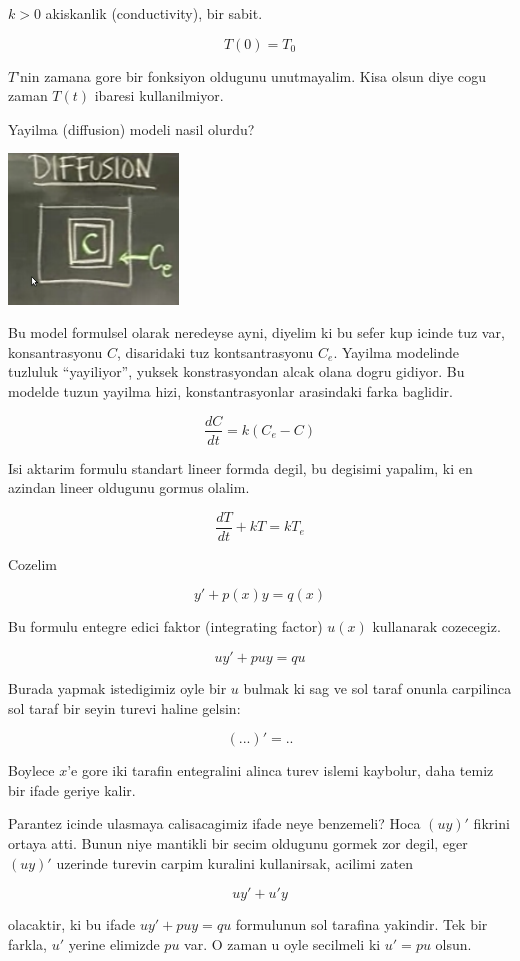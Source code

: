 \documentclass[12pt,fleqn]{article}
\begin{document}
$k > 0$ akiskanlik (conductivity), bir sabit.

\[ T(0) = T_0 \]

$T$'nin zamana gore bir fonksiyon oldugunu unutmayalim. Kisa olsun diye
cogu zaman $T(t)$ ibaresi kullanilmiyor. 

Yayilma (diffusion) modeli nasil olurdu? 

\includegraphics[height=4cm]{3_2.png}

Bu model formulsel olarak neredeyse ayni, diyelim ki bu sefer kup
icinde tuz var, konsantrasyonu $C$, disaridaki tuz kontsantrasyonu
$C_e$. Yayilma modelinde tuzluluk ``yayiliyor'', yuksek konstrasyondan
alcak olana dogru gidiyor. Bu modelde tuzun yayilma hizi,
konstantrasyonlar arasindaki farka baglidir. 

\[ \frac{dC}{dt} = k(C_e - C) \]

Isi aktarim formulu standart lineer formda degil, bu degisimi
yapalim, ki en azindan lineer oldugunu gormus olalim. 

\[ \frac{dT}{dt} + kT = kT_e \]

Cozelim

\[ y' + p(x)y = q(x) \]

Bu formulu entegre edici faktor (integrating factor) $u(x)$ kullanarak
cozecegiz.

\[ uy' + puy = qu \]

Burada yapmak istedigimiz oyle bir $u$ bulmak ki sag ve sol taraf
onunla carpilinca sol taraf bir seyin turevi haline gelsin:

\[ ( ... )' = ..  \]

Boylece $x$'e gore iki tarafin entegralini alinca turev islemi
kaybolur, daha temiz bir ifade geriye kalir. 

Parantez icinde ulasmaya calisacagimiz ifade neye benzemeli? Hoca
$(uy)'$ fikrini ortaya atti. Bunun niye mantikli bir secim oldugunu
gormek zor degil, eger $(uy)'$ uzerinde turevin carpim kuralini
kullanirsak, acilimi zaten 

\[ uy' + u'y \]

olacaktir, ki bu ifade $uy' + puy = qu$ formulunun sol tarafina
yakindir. Tek bir farkla, $u'$ yerine elimizde $pu$ var. O zaman u
oyle secilmeli ki $u' = pu$ olsun. 
\end{document}
